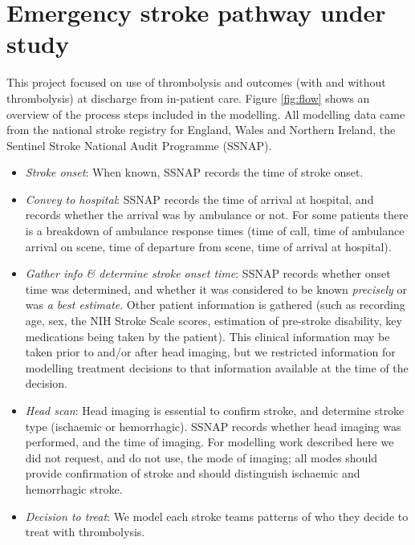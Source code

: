 \section{Emergency stroke pathway under study}

This project focused on use of thrombolysis and outcomes (with and without thrombolysis) at discharge from in-patient care. Figure \ref{fig:flow} shows an overview of the process steps included in the modelling. All modelling data came from the national stroke registry for England, Wales and Northern Ireland, the Sentinel Stroke National Audit Programme (SSNAP).

\begin{itemize}

    \item \textit{Stroke onset}: When known, SSNAP records the time of stroke onset.

    \item \textit{Convey to hospital}: SSNAP records the time of arrival at hospital, and records whether the arrival was by ambulance or not. For some patients there is a breakdown of ambulance response times (time of call, time of ambulance arrival on scene, time of departure from scene, time of arrival at hospital).

    \item \textit{Gather info \& determine stroke onset time}: SSNAP records whether onset time was determined, and whether it was considered to be known \textit{precisely} or was \textit{a best estimate}. Other patient information is gathered (such as recording age, sex, the NIH Stroke Scale scores, estimation of pre-stroke disability, key medications being taken by the patient). This clinical information may be taken prior to and/or after head imaging, but we restricted information for modelling treatment decisions to that information available at the time of the decision.

    \item \textit{Head scan}: Head imaging is essential to confirm stroke, and determine stroke type (ischaemic or hemorrhagic). SSNAP records whether head imaging was performed, and the time of imaging. For modelling work described here we did not request, and do not use, the mode of imaging; all modes should provide confirmation of stroke and should distinguish ischaemic and hemorrhagic stroke. 

    \item \textit{Decision to treat}: We model each stroke teams patterns of who they decide to treat with thrombolysis.


\end{itemize}

